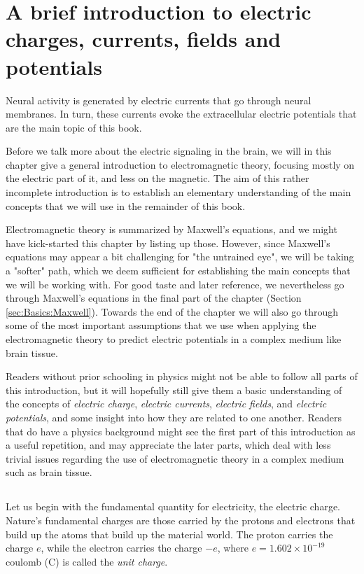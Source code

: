 \chapter{A brief introduction to electric charges, currents, fields and potentials}
\label{chap:Basics}

Neural activity is generated by electric currents that go through neural membranes. In turn, these currents
evoke the extracellular electric potentials that are the main topic of this book.

Before we talk more about the electric signaling in the brain, we will in this chapter give a general introduction to electromagnetic theory, focusing mostly on the electric part of it, and less on the magnetic. The aim of this rather incomplete introduction is to establish an elementary understanding of the main concepts that we will use in the remainder of this book.

Electromagnetic theory is summarized by Maxwell's equations, and we might have kick-started this chapter by listing up those. However, since Maxwell's equations may appear a bit challenging for "the untrained eye", we will be taking a "softer" path, which we deem sufficient for establishing the main concepts that we will be working with. For good taste and later reference, we nevertheless go through Maxwell's equations in the final part of the chapter (Section \ref{sec:Basics:Maxwell}). Towards the end of the chapter we will also go through some of the most important assumptions that we use when applying the electromagnetic theory to predict electric potentials in a complex medium like brain tissue.

Readers without prior schooling in physics might not be able to follow all parts of this introduction, but it will hopefully still give them a basic understanding of the concepts of \textit{electric charge}, \textit{electric currents}, \textit{electric fields}, and \textit{electric potentials}, and some insight into how they are related to one another. Readers that do have a physics background might see the first part of this introduction as a useful repetition, and may appreciate the later parts, which deal with less trivial issues regarding the use of electromagnetic theory in a complex medium such as brain tissue.



\section{}
\label{sec:Basics:Charge} 
Let us begin with the fundamental quantity for electricity, the electric charge. Nature's fundamental charges are those carried by the protons and electrons that build up the atoms that build up the material world. The proton carries the charge $e$, while the electron carries the charge $-e$, where $e = 1.602\times10^{-19}$ coulomb (\si{\coulomb}) is called the \textit{unit charge}. 

